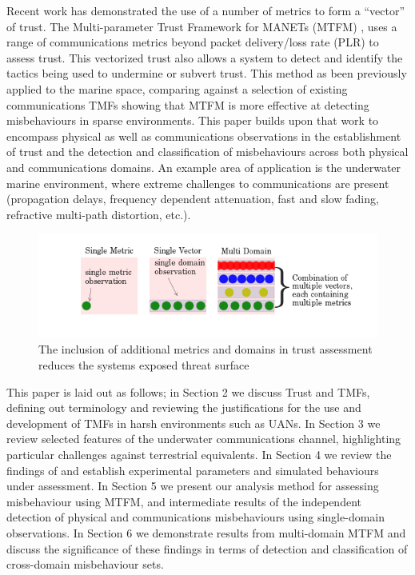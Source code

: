 \documentclass{aamas2016}
\begin{document}
Recent work has demonstrated the use of a number of metrics to form a ``vector'' of trust. The Multi-parameter Trust Framework for MANETs (MTFM) \cite{Guo11}, uses a range of communications metrics beyond packet delivery/loss rate (PLR) to assess trust. This vectorized trust also allows a system to detect and identify the tactics being used to undermine or subvert trust. This method as been previously applied to the marine space, comparing against a selection of existing communications TMFs \cite{Bolster2015} showing that MTFM is more effective at detecting misbehaviours in sparse environments. This paper builds upon that work to encompass physical as well as communications observations in the establishment of trust and the detection and classification of misbehaviours across both physical and communications domains. 
An example area of application is the underwater marine environment, where extreme challenges to communications are present (propagation delays, frequency dependent attenuation, fast and slow fading, refractive multi-path distortion, etc.).
\begin{figure}[h!]
	\centering
	\includegraphics[width=\linewidth]{threat_surface_sum}
	
	\caption{The inclusion of additional metrics and domains in trust assessment reduces the systems exposed threat surface}
\end{figure}

This paper is laid out as follows; in Section 2 we discuss Trust and TMFs, defining out terminology and reviewing the justifications for the use and development of TMFs in harsh environments such as UANs.
In Section 3 we review selected features of the underwater communications channel, highlighting particular challenges against terrestrial equivalents. 
In Section 4 we review the findings of \cite{Bolster2015} and establish experimental parameters and simulated behaviours under assessment. 
In Section 5 we present our analysis method for assessing misbehaviour using MTFM, and intermediate results of the independent detection of physical and communications misbehaviours using single-domain observations. 
In Section 6 we demonstrate results from multi-domain MTFM and discuss the significance of these findings in terms of detection and classification of cross-domain misbehaviour sets.
\end{document}
